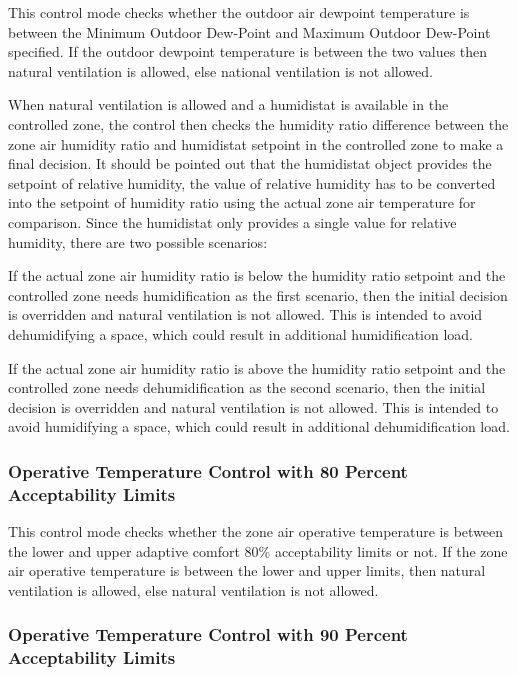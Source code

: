 This control mode checks whether the outdoor air dewpoint temperature is between the Minimum Outdoor Dew-Point and Maximum Outdoor Dew-Point specified. If the outdoor dewpoint temperature is between the two values then natural ventilation is allowed, else national ventilation is not allowed.

When natural ventilation is allowed and a humidistat is available in the controlled zone, the control then checks the humidity ratio difference between the zone air humidity ratio and humidistat setpoint in the controlled zone to make a final decision. It should be pointed out that the humidistat object provides the setpoint of relative humidity, the value of relative humidity has to be converted into the setpoint of humidity ratio using the actual zone air temperature for comparison. Since the humidistat only provides a single value for relative humidity, there are two possible scenarios:

If the actual zone air humidity ratio is below the humidity ratio setpoint and the controlled zone needs humidification as the first scenario, then the initial decision is overridden and natural ventilation is not allowed. This is intended to avoid dehumidifying a space, which could result in additional humidification load.

If the actual zone air humidity ratio is above the humidity ratio setpoint and the controlled zone needs dehumidification as the second scenario, then the initial decision is overridden and natural ventilation is not allowed. This is intended to avoid humidifying a space, which could result in additional dehumidification load.

\subsubsection{Operative Temperature Control with 80 Percent Acceptability Limits}\label{operative-temperature-control-with-80-acceptability-limits}

 This control mode checks whether the zone air operative temperature is between the lower and upper adaptive comfort 80\% acceptability limits or not. If the zone air operative temperature is between the lower and upper limits, then natural ventilation is allowed, else natural ventilation is not allowed. 

\subsubsection{Operative Temperature Control with 90 Percent Acceptability Limits}\label{operative-temperature-control-with-90-acceptability-limits}

